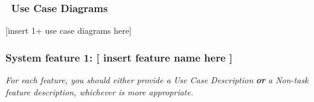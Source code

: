 \documentclass[twoside,letterpaper]{article}
\begin{document}
\subsubsection[\ Use Case
Diagrams]{\foreignlanguage{english}{\ }\foreignlanguage{english}{Use
Case Diagrams}}
{\color{black}
[insert 1+ use case diagrams here]}

\subsubsection[System feature 1: [ insert feature name here
{]}]{\rmfamily\bfseries\color{black} System
feature 1: [ insert feature name here ]}

\bigskip

{\color{black}
\foreignlanguage{english}{\textit{For each feature, you should either
provide a Use Case Description
}}\foreignlanguage{english}{\textbf{\textit{or}}}\foreignlanguage{english}{\textit{
a Non-task feature description, whichever is more appropriate.}}}


\bigskip
\end{document}
